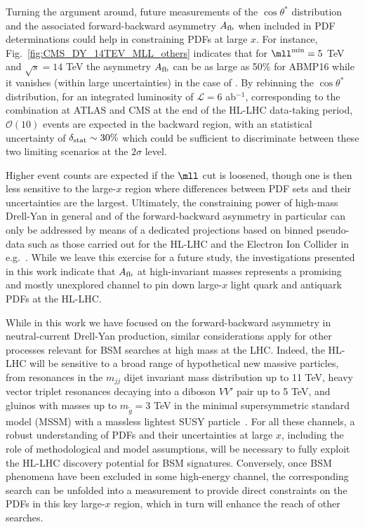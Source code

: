 Turning the argument around, future measurements of the $\cos\theta^*$
distribution and the associated forward-backward asymmetry 
$A_{\rm fb}$ when included in PDF determinations could help in
constraining PDFs at large $x$.
%
For instance, Fig.~\ref{fig:CMS_DY_14TEV_MLL_others} indicates that for
$\mll^{\rm min}=5$ TeV and $\sqrt{s}=14$ TeV the
asymmetry $A_{\rm fb}$ can be as large as 50\% for ABMP16
while it vanishes (within large uncertainties) in the case of .
%
By rebinning the $\cos\theta^*$ distribution, for an integrated
luminosity of $\mathcal{L}=6$ ab$^{-1}$, corresponding to the
combination at ATLAS and CMS 
at the end of the HL-LHC data-taking period, $\mathcal{O}(10)$ events are expected in the backward region,
with an statistical uncertainty of $\delta_{\rm stat}\sim 30\%$ which could be sufficient to
discriminate between these two limiting scenarios at the $2\sigma$ level.

Higher event counts are expected if the $\mll$ cut is loosened, though one is
then less sensitive to the large-$x$ region where differences between PDF sets and their
uncertainties are the largest.
%
Ultimately, the constraining power of high-mass Drell-Yan in general and of the forward-backward
asymmetry in particular can only be addressed by means of a dedicated projections
based on binned pseudo-data such as those carried
out for the HL-LHC and the Electron Ion Collider in e.g.~\cite{AbdulKhalek:2018rok,Khalek:2021ulf}.
%
While we leave this exercise for a future study, the investigations
presented in this work indicate that $A_{\rm fb}$
at high-invariant masses represents a promising and mostly
unexplored channel to pin down large-$x$ light
quark and antiquark PDFs at the HL-LHC.

While in this work
we have focused on the forward-backward asymmetry in neutral-current Drell-Yan production,
similar considerations apply for other processes relevant
for BSM searches at high mass at the LHC.
%
Indeed, the HL-LHC will be sensitive to a broad range of hypothetical
new massive particles, from resonances in the $m_{jj}$ dijet invariant mass distribution up to 11 TeV,
heavy vector triplet resonances decaying into a diboson $VV'$ pair up to 5 TeV,
and gluinos with masses up to $m_{\tilde{g}}=3$ TeV in the minimal
supersymmetric standard model (MSSM) with a massless lightest SUSY
particle~\cite{CidVidal:2018eel}.
%
For all these channels, a robust understanding of PDFs
and their uncertainties at large $x$, including the role of
methodological and model assumptions, will be necessary to fully exploit
the HL-LHC discovery potential for BSM signatures.
%
%
Conversely, once BSM phenomena have been excluded in some high-energy channel,
the corresponding search can be unfolded into a measurement to provide direct
constraints on the PDFs in this key large-$x$ region, which in turn will
enhance the reach of other searches.

